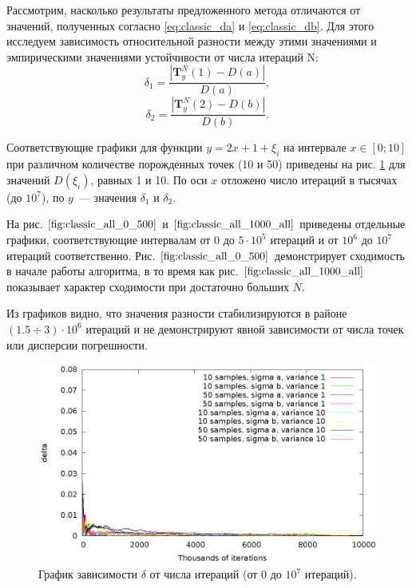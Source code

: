 \documentclass[12pt,a4paper]{article}
\begin{document}
Рассмотрим, насколько результаты предложенного метода отличаются от значений,
полученных согласно \eqref{eq:classic_da} и \eqref{eq:classic_db}. Для этого исследуем
зависимость относительной разности между этими значениями и эмпирическими значениями устойчивости от
числа итераций N:
\[
  \delta_1 = \frac{| \mathbf{T}^N_y(1) - D(a) |}{D(a)},
\]
\[
  \delta_2 = \frac{| \mathbf{T}^N_y(2) - D(b) |}{D(b)}.
\]

Соответствующие графики для функции $y = 2x + 1 + \xi_i$ на интервале $x \in [0; 10]$ при
различном количестве порожденных точек (10 и 50) приведены на рис. \ref{fig:classic_all_0_all}
для значений $D(\xi_i)$, равных 1 и 10. По оси $x$ отложено
число итераций в тысячах (до $10^7$), по $y$~--- значения $\delta_1$ и $\delta_2$.

На рис. $\ref{fig:classic_all_0_500}$ и $\ref{fig:classic_all_1000_all}$ приведены
отдельные графики, соответствующие интервалам от 0 до $5 \cdot 10^5$ итераций и от $10^6$ до
$10^7$ итераций соответственно. Рис. $\ref{fig:classic_all_0_500}$ демонстрирует
сходимость в начале работы алгоритма, в то время как рис. $\ref{fig:classic_all_1000_all}$
показывает характер сходимости при достаточно больших $N$.

Из графиков видно, что значения разности стабилизируются в районе $(1.5 \div 3) \cdot 10^6$
итераций и не демонстрируют явной зависимости от числа точек или дисперсии погрешности.

\begin{figure}[h]
  \centering
  \includegraphics[scale=1.2]{figs/classic/variance_all_0_all.eps}
  \caption{График зависимости $\delta$ от числа итераций (от 0 до $10^7$ итераций).}
  \label{fig:classic_all_0_all}
\end{figure}
\end{document}
